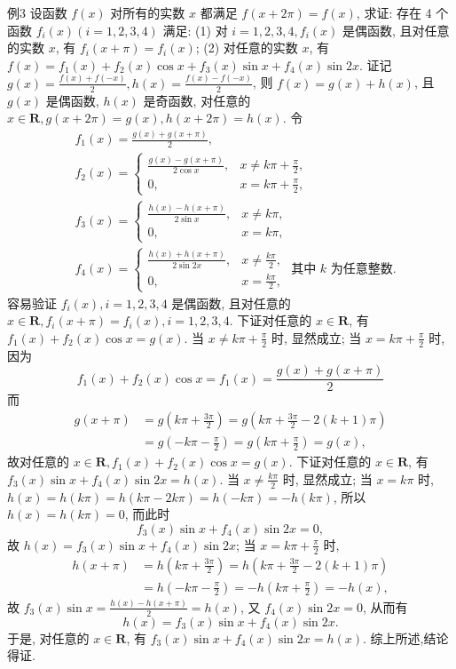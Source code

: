 例3 设函数 $f(x)$ 对所有的实数 $x$ 都满足 $f(x+2 \pi)=f(x)$, 求证: 存在 4 个函数 $f_i(x)(i=1,2,3,4)$ 满足:
(1) 对 $i=1,2,3,4, f_i(x)$ 是偶函数, 且对任意的实数 $x$, 有 $f_i(x+ \pi)=f_i(x)$;
(2) 对任意的实数 $x$, 有 $f(x)=f_1(x)+f_2(x) \cos x+f_3(x) \sin x+ f_4(x) \sin 2 x$. 
证记 $g(x)=\frac{f(x)+f(-x)}{2}, h(x)=\frac{f(x)-f(-x)}{2}$, 则 $f(x)= g(x)+h(x)$, 且 $g(x)$ 是偶函数, $h(x)$ 是奇函数, 对任意的 $x \in \mathbf{R}, g(x+2 \pi)= g(x), h(x+2 \pi)=h(x)$. 令
$$
\begin{aligned}
& f_1(x)=\frac{g(x)+g(x+\pi)}{2}, \\
& f_2(x)= \begin{cases}\frac{g(x)-g(x+\pi)}{2 \cos x}, & x \neq k \pi+\frac{\pi}{2}, \\
0, & x=k \pi+\frac{\pi}{2},\end{cases} \\
& f_3(x)= \begin{cases}\frac{h(x)-h(x+\pi)}{2 \sin x}, & x \neq k \pi, \\
0, & x=k \pi,\end{cases} \\
& f_4(x)=\left\{\begin{array}{ll}
\frac{h(x)+h(x+\pi)}{2 \sin 2 x}, & x \neq \frac{k \pi}{2}, \\
0, & x=\frac{k \pi}{2},
\end{array} \text { 其中 } k\right. \text { 为任意整数.
}
\end{aligned}
$$
容易验证 $f_i(x), i=1,2,3,4$ 是偶函数, 且对任意的 $x \in \mathbf{R}, f_i(x+\pi)= f_i(x), i=1,2,3,4$.
下证对任意的 $x \in \mathbf{R}$, 有 $f_1(x)+f_2(x) \cos x=g(x)$.
当 $x \neq k \pi+\frac{\pi}{2}$ 时, 显然成立; 当 $x=k \pi+\frac{\pi}{2}$ 时, 因为
$$
f_1(x)+f_2(x) \cos x=f_1(x)=\frac{g(x)+g(x+\pi)}{2}
$$
而
$$
\begin{aligned}
g(x+\pi) & =g\left(k \pi+\frac{3 \pi}{2}\right)=g\left(k \pi+\frac{3 \pi}{2}-2(k+1) \pi\right) \\
& =g\left(-k \pi-\frac{\pi}{2}\right)=g\left(k \pi+\frac{\pi}{2}\right)=g(x),
\end{aligned}
$$
故对任意的 $x \in \mathbf{R}, f_1(x)+f_2(x) \cos x=g(x)$.
下证对任意的 $x \in \mathbf{R}$, 有 $f_3(x) \sin x+f_4(x) \sin 2 x=h(x)$.
当 $x \neq \frac{k \pi}{2}$ 时, 显然成立; 当 $x=k \pi$ 时, $h(x)=h(k \pi)=h(k \pi-2 k \pi)= h(-k \pi)=-h(k \pi)$, 所以 $h(x)=h(k \pi)=0$, 而此时
$$
f_3(x) \sin x+f_4(x) \sin 2 x=0,
$$
故 $h(x)=f_3(x) \sin x+f_4(x) \sin 2 x$;
当 $x=k \pi+\frac{\pi}{2}$ 时,
$$
\begin{aligned}
h(x+\pi) & =h\left(k \pi+\frac{3 \pi}{2}\right)=h\left(k \pi+\frac{3 \pi}{2}-2(k+1) \pi\right) \\
& =h\left(-k \pi-\frac{\pi}{2}\right)=-h\left(k \pi+\frac{\pi}{2}\right)=-h(x),
\end{aligned}
$$
故 $f_3(x) \sin x=\frac{h(x)-h(x+\pi)}{2}=h(x)$, 又 $f_4(x) \sin 2 x=0$, 从而有
$$
h(x)=f_3(x) \sin x+f_4(x) \sin 2 x .
$$
于是, 对任意的 $x \in \mathbf{R}$, 有 $f_3(x) \sin x+f_4(x) \sin 2 x=h(x)$. 综上所述,结论得证.



